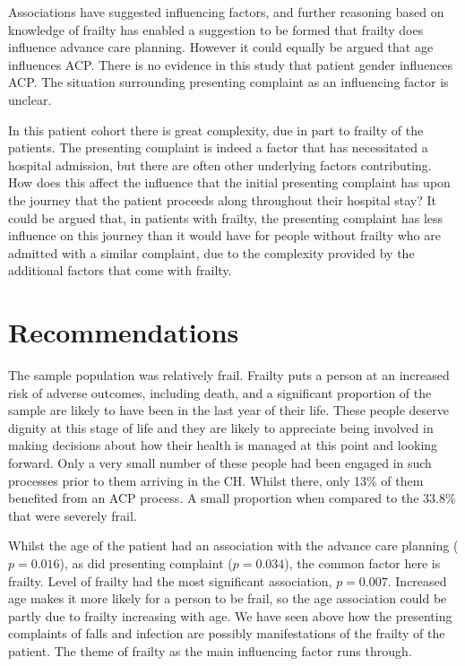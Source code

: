 \documentclass
[
	12pt,
	a4paper,
	oneside,
]{report}
\begin{document}
Associations have suggested influencing factors, and further reasoning based
on knowledge of frailty has enabled a suggestion to be formed that frailty
does influence advance care planning. However it could equally be argued
that age influences ACP. There is no evidence in this study that patient
gender influences ACP. The situation surrounding presenting complaint as
an influencing factor is unclear.

In this patient cohort there is great complexity, due in part to frailty
of the patients. The presenting complaint is indeed a factor that has 
necessitated a hospital admission, but there are often other underlying
factors contributing. How does this affect the influence that the initial
presenting complaint has upon the journey that the patient proceeds along
throughout their hospital stay? It could be argued that, in patients with
frailty, the presenting complaint has less influence on this journey than
it would have for people without frailty who are admitted with a similar
complaint, due to the complexity provided by the additional factors that
come with frailty.

\section{Recommendations}

The sample population was relatively frail. Frailty puts a person at an 
increased risk of adverse outcomes, including death, and a significant
proportion of the sample are likely to have been in the last year of their life.
These people deserve dignity at this stage of life and they are likely
to appreciate being involved in making decisions about how their health is
managed at this point and looking forward. Only a very small number of these 
people had been engaged in such processes prior to them arriving in the CH.
Whilst there, only 13\% of them benefited from an ACP process. A small 
proportion when compared to the 33.8\% that were severely frail.

Whilst the age of the patient
had an association with the advance care planning ($p=0.016$), as did 
presenting complaint ($p=0.034$),
the common factor here is frailty. Level of frailty had the most 
significant association, $p=0.007$. Increased age makes it more likely for a 
person to be frail, so the age association could be partly due to frailty
increasing with age. We have seen above how the presenting complaints of 
falls and infection are possibly manifestations of the frailty of the patient.
The theme of frailty as the main influencing factor runs through.
\end{document}
